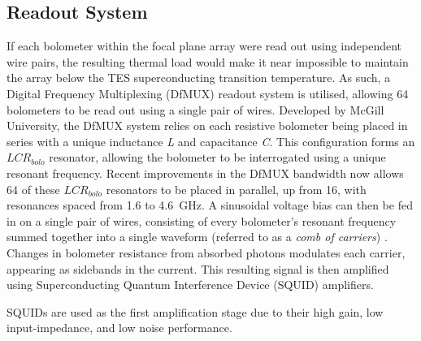 \documentclass[iop]{emulateapj}
\begin{document}
\subsection{Readout System}

If each bolometer within the focal plane array were read out using independent wire pairs, the resulting thermal load would make it near impossible to maintain the array below the TES superconducting transition temperature.  As such, a Digital Frequency Multiplexing (DfMUX) readout system is utilised, allowing 64 bolometers to be read out using a single pair of wires.  Developed by McGill University, the DfMUX system relies on each resistive bolometer being placed in series with a unique inductance \textit{L} and capacitance \textit{C}.  This configuration forms an $LCR_{bolo}$ resonator, allowing the bolometer to be interrogated using a unique resonant frequency.  Recent improvements in the DfMUX bandwidth now allows 64 of these $LCR_{bolo}$ resonators to be placed in parallel, up from 16, with resonances spaced from 1.6 to 4.6~GHz.  A sinusoidal voltage bias can then be fed in on a single pair of wires, consisting of every bolometer's resonant frequency summed together into a single waveform (referred to as a \textit{comb of carriers}) \citep{bender_digital_2014}.  Changes in bolometer resistance from absorbed photons modulates each carrier, appearing as sidebands in the current.  This resulting signal is then amplified using Superconducting Quantum Interference Device (SQUID) amplifiers.

SQUIDs are used as the first amplification stage due to their high gain, low input-impedance, and low noise performance.  




\end{document}

